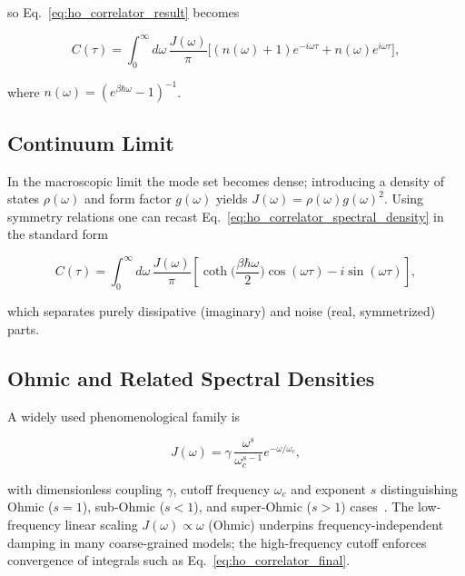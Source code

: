 \noindent
so Eq.~\eqref{eq:ho_correlator_result} becomes

\begin{equation} \label{eq:ho_correlator_spectral_density}
	C(\tau) = \int_{0}^{\infty} d\omega \, \frac{J(\omega)}{\pi} \Big[(n(\omega)+1)e^{-i \omega \tau} + n(\omega) e^{i \omega \tau}\Big],
\end{equation}

\noindent
where $n(\omega)= (e^{\beta \hbar \omega}-1)^{-1}$.


\subsection{Continuum Limit}
\label{subsec:continuum_limit}

\noindent
In the macroscopic limit the mode set becomes dense; introducing a density of states $\rho(\omega)$ and form factor $g(\omega)$ yields $J(\omega)=\rho(\omega) g(\omega)^2$. Using symmetry relations one can recast Eq.~\eqref{eq:ho_correlator_spectral_density} in the standard form

\begin{equation} \label{eq:ho_correlator_final}
	C(\tau) = \int_{0}^{\infty} d\omega \, \frac{J(\omega)}{\pi} \left[ \coth\Big(\frac{\beta \hbar \omega}{2}\Big) \cos(\omega \tau) - i \sin(\omega \tau) \right],
\end{equation}

\noindent
which separates purely dissipative (imaginary) and noise (real, symmetrized) parts.


\subsection{Ohmic and Related Spectral Densities}
\label{subsec:ohmic_spectral_density}

\noindent
A widely used phenomenological family is

\begin{equation} \label{eq:ho_ohmic_spectral_density}
	J(\omega) = \gamma \, \frac{\omega^{s}}{\omega_c^{s-1}} e^{-\omega/\omega_c},
\end{equation}

\noindent
with dimensionless coupling $\gamma$, cutoff frequency $\omega_c$ and exponent $s$ distinguishing Ohmic ($s=1$), sub-Ohmic ($s<1$), and super-Ohmic ($s>1$) cases~\cite{weiss2012quantumdissipativesystems, lambertetal2024qutip5quantum}. The low-frequency linear scaling $J(\omega) \propto \omega$ (Ohmic) underpins frequency-independent damping in many coarse-grained models; the high-frequency cutoff enforces convergence of integrals such as Eq.~\eqref{eq:ho_correlator_final}.

